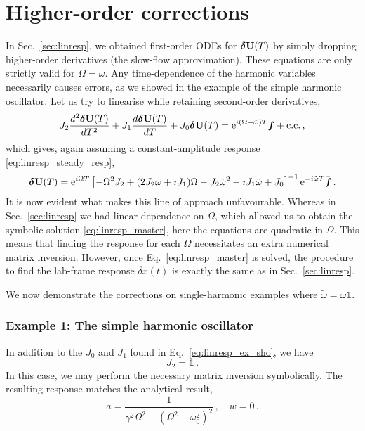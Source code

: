 \section{Higher-order corrections} \label{sec:noisecorr}

In Sec.~\ref{sec:linresp}, we obtained first-order ODEs for $\boldsymbol{\delta} \vb{U}(T)$ by simply dropping higher-order derivatives (the slow-flow approximation). These equations are only strictly valid for $\Omega=\omega$. Any time-dependence of the harmonic variables necessarily causes errors, as we showed in the example of the simple harmonic oscillator. Let us try to linearise while retaining second-order derivatives,
\begin{equation}
J_2 \frac{d^2 \boldsymbol{\delta} \vb{U}(T)}{dT^2} + J_1 \frac{d \boldsymbol{\delta} \vb{U}(T)}{d T} + J_0 \boldsymbol{\delta} \vb{U}(T) = {\rm e}^{i (\Omega - \tilde{\omega}) T} \bar{\boldsymbol{f}} + \text{c.c.}\,,
\end{equation}
which gives, again assuming a constant-amplitude response \eqref{eq:linresp_steady_resp},
\begin{equation} \label{eq:respcorr_master}
\boldsymbol{\delta} \vb{U}(T) = {\rm e}^{i \Omega T} \left[ -\Omega^2 J_2 + (2 J_2 \tilde{\omega} + i J_1) \Omega - J_2 \tilde{\omega}^2 - i J_1 \tilde{\omega} + J_0 \right]^{-1} {\rm e}^{-i \tilde{\omega} T } \bar{\boldsymbol{f}} \,.
\end{equation}
It is now evident what makes this line of approach unfavourable. Whereas in Sec.~\ref{sec:linresp} we had linear dependence on $\Omega$, which allowed us to obtain the symbolic solution \eqref{eq:linresp_master}, here the equations are quadratic in $\Omega$. This means that finding the response for each $\Omega$ necessitates an extra numerical matrix inversion. However, once Eq.~\eqref{eq:linresp_master} is solved, the procedure to find the lab-frame response $\delta x(t)$ is exactly the same as in Sec.~\ref{sec:linresp}. %

We now demonstrate the corrections on single-harmonic examples where $\tilde{\omega} = \omega \mathbb{1}$.

\subsubsection{Example 1: The simple harmonic oscillator}

In addition to the $J_0$ and $J_1$ found in Eq.~\eqref{eq:linresp_ex_sho}, we have
\begin{equation}
J_2 = \mathbb{1} \,.%
\end{equation}
In this case, we may perform the necessary matrix inversion symbolically. The resulting response matches the analytical result,
\begin{equation}
a = \frac{1}{ \gamma^2 \Omega^2 + \left(\Omega^2 - \omega_0^2 \right)^2} \,, \quad w= 0  \,.
\end{equation}

